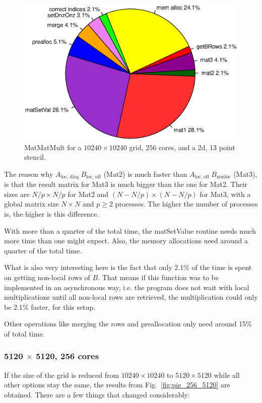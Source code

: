 \begin{figure}[tbp]
	\centering
	\includegraphics[width=1\textwidth, trim={0 3.cm 0 3cm},clip]{256cores_10240}
	\caption{MatMatMult for a $10240\times 10240$ grid, 256 cores, and a 2d, 13 point stencil.} 
	\label{fig:pie_256_10240}
\end{figure}

The reason why $A_{\textrm{loc, diag~}} B_{\textrm{loc, off}}$ (Mat2) is much faster than $A_{\textrm{loc, off~}} B_{\textrm{nonloc}}$ (Mat3), is that the result matrix for Mat3 is much bigger than the one for Mat2. Their sizes are $N/p \times N/p$ for Mat2 and $(N-N/p) \times (N-N/p)$ for Mat3, with a global matrix size $N\times N$ and $p\geq2$ processes. The higher the number of processes is, the higher is this difference.

With more than a quarter of the total time, the matSetValue routine needs much more time than one might expect. Also, the memory allocations need around a quarter of the total time. 

What is also very interesting here is the fact that only 2.1\% of the time is spent on getting non-local rows of $B$. That means if this function was to be implemented in an asynchronous way, i.e. the program does not wait with local multiplications until all non-local rows are retrieved, the multiplication could only be 2.1\% faster, for this setup. 

Other operations like merging the rows and preallocation only need around 15\% of total time.



\subsubsection*{5120 $\times$ 5120, 256 cores}
If the size of the grid is reduced from $10240 \times 10240$ to $5120 \times 5120$ while all other options stay the same, the results from Fig.~\ref{fig:pie_256_5120} are obtained. There are a few things that changed considerably: 


